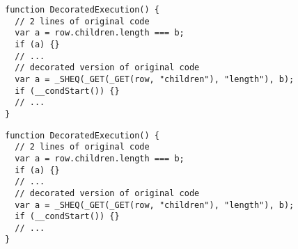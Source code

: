 \begin{figure}
\begin{lstlisting}[caption=Example showing how code is decorated for logging execution and using the trace to construct a dynamic backward slice,label=decorated]  
function DecoratedExecution() {
  // 2 lines of original code
  var a = row.children.length === b; 
  if (a) {}
  // ...
  // decorated version of original code
  var a = _SHEQ(_GET(_GET(row, "children"), "length"), b);
  if (__condStart()) {}
  // ...
}
\end{lstlisting}
\end{figure}
\begin{figure}
\begin{lstlisting}[caption=Example showing how code is decorated for logging execution and using the trace to construct a dynamic backward slice,label=sheq]  
function DecoratedExecution() {
  // 2 lines of original code
  var a = row.children.length === b; 
  if (a) {}
  // ...
  // decorated version of original code
  var a = _SHEQ(_GET(_GET(row, "children"), "length"), b);
  if (__condStart()) {}
  // ...
}
\end{lstlisting}
\end{figure}














